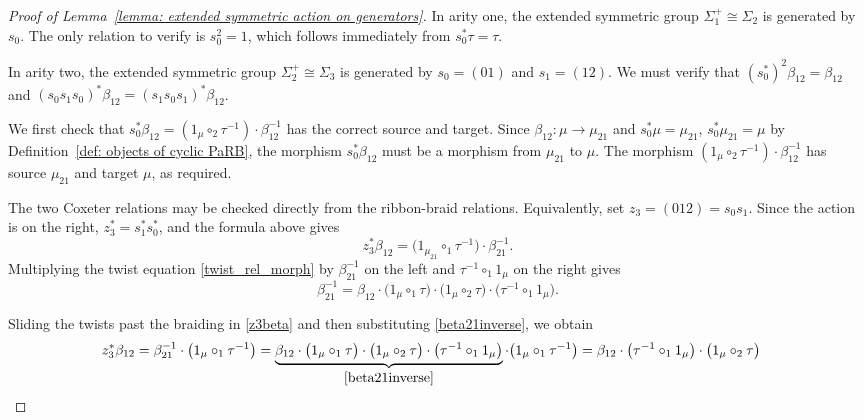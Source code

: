 \documentclass{amsart}
\newcommand{\twist}{\tau}
\theoremstyle{definition}
\numberwithin{equation}{section}
\begin{document}
\begin{proof}[Proof of Lemma~\ref{lemma: extended symmetric action on generators}]
In arity one, the extended symmetric group $\Sigma_1^+\cong\Sigma_2$
is generated by $s_0$. The only relation to verify is $s_0^2=1$,
which follows immediately from $s_0^*\twist=\twist$.

In arity two, the extended symmetric group $\Sigma_2^+\cong\Sigma_3$
is generated by $s_0=(01)$ and $s_1=(12)$. We must verify that
$(s_0^*)^2\beta_{12}=\beta_{12}$ and
$(s_0s_1s_0)^*\beta_{12}=(s_1s_0s_1)^*\beta_{12}$.

We first check that $s_0^*\beta_{12}=(1_\mu\circ_2\twist^{-1})
\cdot\beta_{12}^{-1}$ has the correct source and target. Since
$\beta_{12}\colon\mu\to\mu_{21}$ and $s_0^*\mu=\mu_{21}$,
$s_0^*\mu_{21}=\mu$ by
Definition~\ref{def: objects of cyclic PaRB}, the morphism
$s_0^*\beta_{12}$ must be a morphism from $\mu_{21}$ to $\mu$.
The morphism $(1_\mu\circ_2\twist^{-1})\cdot\beta_{12}^{-1}$
has source $\mu_{21}$ and target $\mu$, as required.

The two Coxeter relations may be checked directly from the
ribbon-braid relations. Equivalently, set
$z_3=(012)=s_0s_1$. Since the action is on the right,
$z_3^*=s_1^*s_0^*$, and the formula above gives
\begin{equation}
\label{z3beta}
z_3^*\beta_{12}
=\bigl(1_{\mu_{21}}\circ_1\twist^{-1}\bigr)
 \cdot\beta_{21}^{-1}.
\end{equation}
Multiplying the twist equation \eqref{twist_rel_morph} by
$\beta_{21}^{-1}$ on the left and
$\twist^{-1}\circ_1 1_\mu$ on the right gives
\begin{equation}
\label{beta21inverse}
\beta_{21}^{-1} =\beta_{12}  \cdot\bigl(1_\mu\circ_1\twist\bigr)  \cdot\bigl(1_\mu\circ_2\twist\bigr) \cdot\bigl(\twist^{-1}\circ_1 1_\mu\bigr).
\end{equation}

Sliding the twists past the braiding in \eqref{z3beta} and then substituting
\eqref{beta21inverse}, we obtain
\begin{equation}\label{z3squaredbeta}
\begin{aligned}
z_3^*\beta_{12}
&=\beta_{21}^{-1}
  \cdot\bigl(1_\mu\circ_1\twist^{-1}\bigr) =\underbrace{\beta_{12}\cdot\bigl(1_\mu\circ_1\twist\bigr)\cdot\bigl(1_\mu\circ_2\twist\bigr)\cdot\bigl(\twist^{-1}\circ_1 1_\mu\bigr)}_{\eqref{beta21inverse}}
  \cdot\bigl(1_\mu\circ_1\twist^{-1}\bigr) =\beta_{12}
  \cdot\bigl(\twist^{-1}\circ_1 1_\mu\bigr)
  \cdot\bigl(1_\mu\circ_2\twist\bigr)
  \end{aligned}
\end{equation}


\end{proof}
\end{document}
